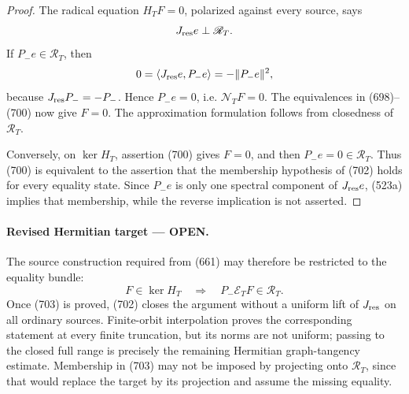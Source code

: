 \documentclass[11pt]{article}
\newcommand{\OPEN}{\textcolor{red!70!black}{\textbf{OPEN}}}
\begin{document}
\begin{proof}
The radical equation \(H_TF=0\), polarized against every source, says
\[
 J_{\rm res}e\perp\mathscr R_T.
\]
If \(P_-e\in\mathscr R_T\), then
\[
 0=\langle J_{\rm res}e,P_-e\rangle
   =-\|P_-e\|^2,
\]
because \(J_{\rm res}P_-=-P_-\).  Hence
\(P_-e=0\), i.e. \(\mathcal N_TF=0\).  The equivalences in
(698)--(700) now give \(F=0\).  The approximation formulation follows
from closedness of \(\mathscr R_T\).

Conversely, on \(\ker H_T\), assertion (700) gives \(F=0\), and then
\(P_-e=0\in\mathscr R_T\).  Thus (700) is equivalent to the assertion that
the membership hypothesis of (702) holds for every equality state.  Since
\(P_-e\) is only one spectral component of \(J_{\rm res}e\), (523a)
implies that membership, while the reverse implication is not asserted.
\end{proof}

\paragraph{Revised Hermitian target --- \OPEN.}
The source construction required from (661) may therefore be restricted to
the equality bundle:
\begin{equation}
 F\in\ker H_T
 \quad\Longrightarrow\quad
 P_-\mathcal E_TF\in\mathscr R_T.                   \tag{703}
\end{equation}
Once (703) is proved, (702) closes the argument without a uniform lift of
\(J_{\rm res}\) on all ordinary sources.  Finite-orbit interpolation proves
the corresponding statement at every finite truncation, but its norms are
not uniform; passing to the closed full range is precisely the remaining
Hermitian graph-tangency estimate.  Membership in (703) may not be imposed
by projecting onto \(\mathscr R_T\), since that would replace the target by
its projection and assume the missing equality.
\end{document}
